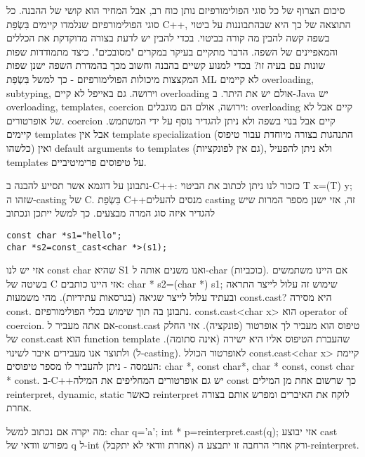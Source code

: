 \begin{טבלא}[!htbp]
        סיכום
        הצרוף של כל סוגי הפולימורפיזם נותן כוח רב, אבל המחיר הוא קושי של ההבנה. כל סוגי הפולימורפיזם שנלמדו קיימים בִּשְׂפַת C++, התוצאה של כך היא שבהתבוננות על ביטוי בשפה קשה להבין מה קורה בביטוי. בכדי להבין יש לדעת בצורה מדוקדקת את הכללים והמאפיינים של השפה. הדבר מתקיים בעיקר במקרים "מסובכים".
        כיצד מתמודדות שפות שונות עם בעיה זו? בכדי למנוע קשיים בהבנה וחשוב מכך בהמדרת השפה ישנן שפות המקצצות מיכולות הפולימורפיזם - כך למשל בִּשְׂפַת ML לא קיימים overloading, subtyping, וירושה. גם באייפל לא קיים overloading אולם יש את היתר.
        ב-Java יש overloading, templates, coercion וירושה, אולם הם מוגבלים:
        overloading קיים אבל לא של אופרטורים.
        coercion קיים אבל בנוי בשפה ולא ניתן להגדיר נוסף על ידי המשתמש.
        קיימים templates אבל אין template specialization (התנהגות בצורה מיוחדת עבור טיפוס כלשהו) ואין default arguments to templates (גם אין לפונקציות), ולא ניתן להפעיל templates על טיפוסים פרימיטיביים.

        נתבונן על דוגמא אשר תסייע להבנה ב-C++:
        כזכור לנו ניתן לכתוב את הביטוי T x=(T) y; שזהו ה-casting של C. בִּשְׂפַת C++מנסים להעלים casting זה, אזי ישנן מספר המרות שיש להגדיר איזה סוג המרה מבצעים. כך למשל ייתכן ונכתוב

\begin{verbatim}
const char *s1="hello";
char *s2=const_cast<char *>(s1);
\end{verbatim}

        אזי יש לנו const char שהיא S1 ואנו משנים אותה ל-char (כוכביות). אם היינו משתמשים בשיטה של C אזי היינו כותבים:
        char * s2=(char *) s1;
        שימוש זה עלול לייצר התראה ובעתיד עלול לייצר שגיאה (בגרסאות עתידיות).
        מהי משמעות const.cast? היא מסירה const. נתבונן בה תוך שימוש בכלי הפולימורפיזם.
        const.cast<char x> הוא operator of coercion. אם אתה מעביר ל-const.cast טיפוס הוא מעביר לך אופרטור (פונקציה). אזי החלק של const.cast הוא function template שהעברת הטיפוס אליו היא ישירה (אינה סתומה). ולתוצר אנו מעבירים איבר לשינוי (ל-casting). לאופרטור הכולל const.cast<char x> קיימת העמסה - ניתן להעביר לו מספר טיפוסים: char *, const char*, char * const, const char * const.
        ב-C++יש גם אופרטורים המחליפים את המילה const כך שרשום אחת מן המילים reinterpret, dynamic, static כאשר reinterpret לוקח את האיברים ומפרש אותם בצורה אחרת.

        מה יקרה אם נכתוב למשל:
        char q='a';
        int * p=reinterpret.cast(q);
        אזי יבוצע cast מפורש וודאי של q ל-int (אחרת וודאי לא יתקבל) ורק אחרי הרחבה זו יתבצע ה-reinterpret.


\end{טבלא}
